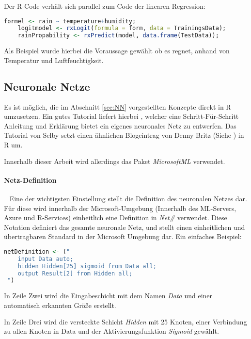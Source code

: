 Der R-Code verhält sich parallel zum Code der linearen Regression:

\begin{lstlisting}[language=R]
	formel <- rain ~ temperature+humidity;
	logitmodel <- rxLogit(formula = form, data = TrainingsData);
	rainPropability <- rxPredict(model, data.frame(TestData));
\end{lstlisting}

Als Beispiel wurde hierbei die Voraussage gewählt ob es regnet, anhand von Temperatur und Luftfeuchtigkeit.
\subsection{Neuronale Netze}
Es ist möglich, die im Abschnitt \ref{sec:NN} vorgestellten Konzepte direkt in R umzusetzen. Ein gutes Tutorial liefert hierbei \cite{SelbyNN}, welcher eine Schritt-Für-Schritt Anleitung und Erklärung bietet ein eigenes neuronales Netz zu entwerfen. Das Tutorial von Selby setzt einen ähnlichen Blogeintrag von Denny Britz (Siehe \cite{DennyNN}) in R um. 

Innerhalb dieser Arbeit wird allerdings das Paket \textit{MicrosoftML} verwendet.

\paragraph{Netz-Definition} ~\newline
Eine der wichtigsten Einstellung stellt die Definition des neuronalen Netzes dar. Für diese wird innerhalb der Microsoft-Umgebung (Innerhalb des ML-Servers, Azure und R-Services) einheitlich eine Definition in \textit{Net\#} verwendet. Diese Notation definiert  das gesamte neuronale Netz, und stellt einen einheitlichen und übertragbaren Standard in der Microsoft Umgebung dar. Ein einfaches Beispiel: ~\newline

\begin{lstlisting}[language=R]
 netDefinition <- ("
 	input Data auto;
 	hidden Hidden[25] sigmoid from Data all;
 	output Result[2] from Hidden all;  
 ")
\end{lstlisting}

In Zeile Zwei wird die Eingabeschicht mit dem Namen \textit{Data} und einer automatisch erkannten Größe erstellt. 

In Zeile Drei wird die versteckte Schicht \textit{Hidden} mit 25 Knoten, einer Verbindung zu allen Knoten in Data und der Aktivierungsfunktion \textit{Sigmoid} gewählt. 

